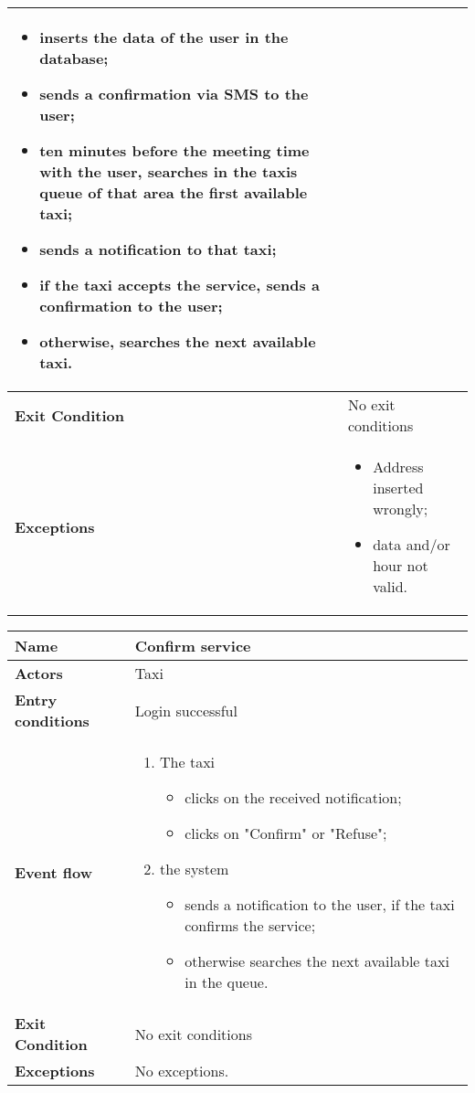 \begin{tabular}{l l}
{\begin{enumerate}
\begin{itemize}
 \item inserts the data of the user in the database;
 \item sends a confirmation via SMS to the user;
 \item ten minutes before the meeting time with the user, searches in the taxis queue of that area the first available taxi;
 \item sends a notification to that taxi;
 \item if the taxi accepts the service, sends a confirmation to the user;
 \item otherwise, searches the next available taxi.
 \end{itemize}
 \end{enumerate}
 } \\ \hline
 \textbf{Exit Condition} & No exit conditions \\ \hline
 \textbf{Exceptions} &  \parbox{0.9\textwidth}{ 
 \begin{itemize}
 \item Address inserted wrongly;
 \item data and/or hour not valid.
 \end{itemize}
 }
\end{tabular}


\vspace{20pt}
\noindent
\begin{tabular}{l l}
 \textbf {Name} & Confirm service  \\ \hline
 \textbf{Actors} & Taxi \\ \hline
 \textbf{Entry conditions} & Login successful \\ \hline
 \textbf{Event flow} & 
 \parbox{0.9\textwidth}{
 \begin{enumerate}
 \item The taxi
 \begin{itemize}
 \item clicks on the received notification;
 \item clicks on "Confirm" or "Refuse";
 \end{itemize}
 \item the system
  \begin{itemize}
 \item sends a notification to the user, if the taxi confirms the service;
 \item otherwise searches the next available taxi in the queue.
 \end{itemize}
 \end{enumerate}
 } \\ \hline
 \textbf{Exit Condition} & No exit conditions \\ \hline
 \textbf{Exceptions} & No exceptions.
\end{tabular}

